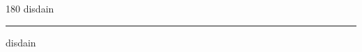 
\begin{frame}
\begin{center}
\begin{turn}{180}
{\fontsize{2.5cm}{1em}\selectfont disdain}
\end{turn}
\vspace{1em}\par  
\hrule
\vspace{1em}\par  
{\fontsize{2.5cm}{1em}\selectfont disdain}
\end{center}
\end{frame}

